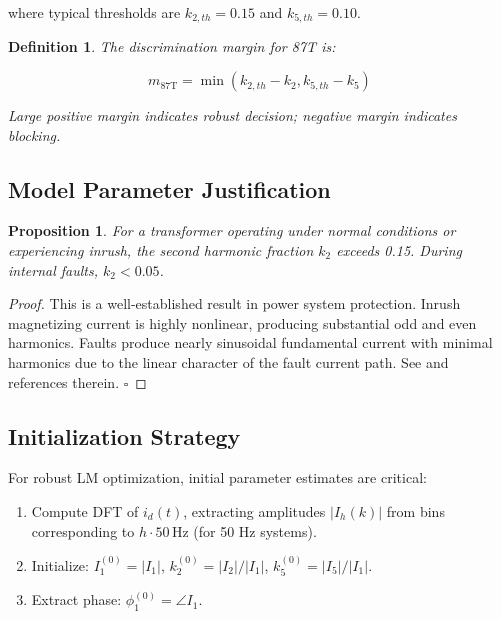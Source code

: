 \documentclass[12pt,a4paper]{article}
\newtheorem{proposition}[theorem]{Proposition}
\newtheorem{definition}{Definition}[section]
\begin{document}
where typical thresholds are $k_{2,th} = 0.15$ and $k_{5,th} = 0.10$.

\begin{definition}
The \textit{discrimination margin} for 87T is:

\begin{equation}
m_{\text{87T}} = \min(k_{2,th} - k_2, k_{5,th} - k_5)
\label{eq:87t_margin}
\end{equation}

Large positive margin indicates robust decision; negative margin indicates blocking.
\end{definition}

\subsection{Model Parameter Justification}
\label{subsec:87t_justification}

\begin{proposition}
\label{prop:87t_discrimination}
For a transformer operating under normal conditions or experiencing inrush, the 
second harmonic fraction $k_2$ exceeds 0.15. During internal faults, $k_2 < 0.05$.
\end{proposition}

\begin{proof}
This is a well-established result in power system protection. Inrush magnetizing current 
is highly nonlinear, producing substantial odd and even harmonics. Faults produce 
nearly sinusoidal fundamental current with minimal harmonics due to the linear 
character of the fault current path. See \cite{Schweitzer1991} and references therein. 
\hfill $\square$
\end{proof}

\subsection{Initialization Strategy}
\label{subsec:87t_init}

For robust LM optimization, initial parameter estimates are critical:

\begin{enumerate}
    \item Compute DFT of $i_d(t)$, extracting amplitudes $|I_h(k)|$ from bins corresponding 
    to $h \cdot 50\, \text{Hz}$ (for 50 Hz systems).
    
    \item Initialize: $I_1^{(0)} = |I_1|$, $k_2^{(0)} = |I_2|/|I_1|$, $k_5^{(0)} = |I_5|/|I_1|$.
    
    \item Extract phase: $\phi_1^{(0)} = \angle I_1$.
\end{enumerate}
\end{document}
